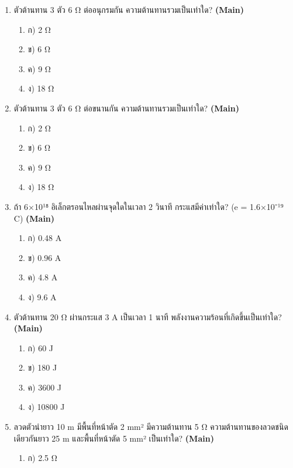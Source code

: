\documentclass[12pt]{article}
\begin{document}
\begin{enumerate}[label=\arabic*.]
\begin{enumerate}[label=)]
\item ก) เท่ากับกระแส
\item ข) เท่ากับศูนย์
\item ค) เท่ากับผลรวมของความต้านทาน
\item ง) เท่ากับกำลัง
\end{enumerate}
\item ตัวต้านทาน 3 ตัว 6 Ω ต่ออนุกรมกัน ความต้านทานรวมเป็นเท่าใด? \hfill \textbf{\small (Main)}
\begin{enumerate}[label=)]
\item ก) 2 Ω
\item ข) 6 Ω
\item ค) 9 Ω
\item ง) 18 Ω
\end{enumerate}
\item ตัวต้านทาน 3 ตัว 6 Ω ต่อขนานกัน ความต้านทานรวมเป็นเท่าใด? \hfill \textbf{\small (Main)}
\begin{enumerate}[label=)]
\item ก) 2 Ω
\item ข) 6 Ω
\item ค) 9 Ω
\item ง) 18 Ω
\end{enumerate}
\item ถ้า 6×10¹⁸ อิเล็กตรอนไหลผ่านจุดใดในเวลา 2 วินาที กระแสมีค่าเท่าใด? (e = 1.6×10⁻¹⁹ C) \hfill \textbf{\small (Main)}
\begin{enumerate}[label=)]
\item ก) 0.48 A
\item ข) 0.96 A
\item ค) 4.8 A
\item ง) 9.6 A
\end{enumerate}
\item ตัวต้านทาน 20 Ω ผ่านกระแส 3 A เป็นเวลา 1 นาที พลังงานความร้อนที่เกิดขึ้นเป็นเท่าใด? \hfill \textbf{\small (Main)}
\begin{enumerate}[label=)]
\item ก) 60 J
\item ข) 180 J
\item ค) 3600 J
\item ง) 10800 J
\end{enumerate}
\item ลวดตัวนำยาว 10 m มีพื้นที่หน้าตัด 2 mm² มีความต้านทาน 5 Ω ความต้านทานของลวดชนิดเดียวกันยาว 25 m และพื้นที่หน้าตัด 5 mm² เป็นเท่าใด? \hfill \textbf{\small (Main)}
\begin{enumerate}[label=)]
\item ก) 2.5 Ω

\end{enumerate}
\end{enumerate}
\end{document}
